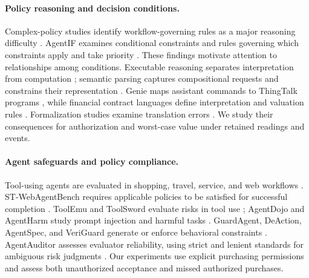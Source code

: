 \documentclass[11pt]{article}
\begin{document}
\paragraph{Policy reasoning and decision conditions.}
Complex-policy studies identify workflow-governing rules as a major reasoning difficulty \citep{complexpolicy}. AgentIF examines conditional constraints and rules governing which constraints apply and take priority \citep{agentif}. These findings motivate attention to relationships among conditions. Executable reasoning separates interpretation from computation \citep{pal,logiclm,linc}; semantic parsing captures compositional requests and constrains their representation \citep{gupta2018hierarchical,shin2021constrained}. Genie maps assistant commands to ThingTalk programs \citep{campagna2019genie}, while financial contract languages define interpretation and valuation rules \citep{composingcontracts}. Formalization studies examine translation errors \citep{folcode,fover,verify}. We study their consequences for authorization and worst-case value under retained readings and events.

\paragraph{Agent safeguards and policy compliance.}
Tool-using agents \citep{react,schick2023toolformer} are evaluated in shopping, travel, service, and web workflows \citep{webshop,travelplanner,taubench,zhou2024webarena,deng2023mind2web}. ST-WebAgentBench requires applicable policies to be satisfied for successful completion \citep{stwebagentbench}.
ToolEmu and ToolSword evaluate risks in tool use \citep{toolemu,ye2024toolsword}; AgentDojo and AgentHarm study prompt injection and harmful tasks \citep{agentdojo,agentharm}. GuardAgent, DeAction, AgentSpec, and VeriGuard generate or enforce behavioral constraints \citep{guardagent,deaction,agentspec,veriguard}. AgentAuditor assesses evaluator reliability, using strict and lenient standards for ambiguous risk judgments \citep{agentauditor}. Our experiments use explicit purchasing permissions and assess both unauthorized acceptance and missed authorized purchases.
\end{document}
